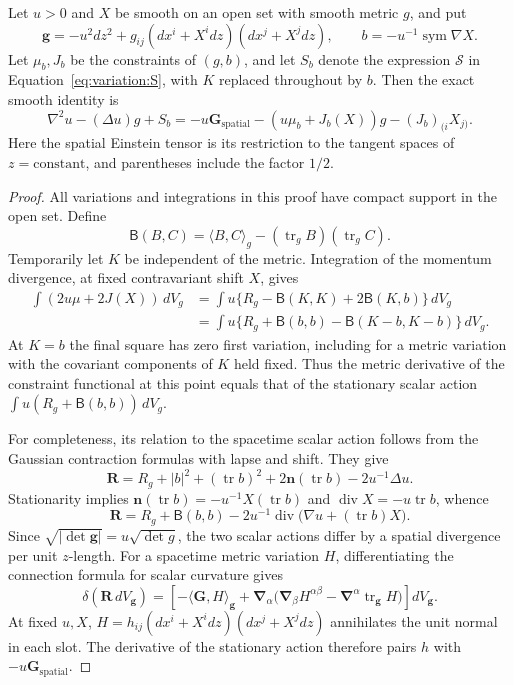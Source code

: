 \begin{lemma}
\label{lem:variation:stationary-action}
Let $u>0$ and $X$ be smooth on an open set with smooth metric $g$, and put
\[
 \mathbf g=-u^2dz^2+g_{ij}(dx^i+X^i dz)(dx^j+X^j dz),
 \qquad b=-u^{-1}\operatorname{sym}\nabla X.
\]
Let $\mu_b,J_b$ be the constraints of $(g,b)$, and let $S_b$ denote
the expression $\mathcal S$ in Equation~\eqref{eq:variation:S}, with
$K$ replaced throughout by $b$.  Then the exact smooth identity is
\[
 \nabla^2u-(\Delta u)g+S_b
  =-u\mathbf G_{\mathrm{spatial}}
        -(u\mu_b+J_b(X))g-(J_b)_{(i}X_{j)}.
\]
Here the spatial Einstein tensor is its restriction to the tangent
spaces of $z=\mathrm{constant}$, and parentheses include the factor
$1/2$.
\end{lemma}

\begin{proof}
All variations and integrations in this proof have compact support in
the open set.  Define
\[
 \mathsf B(B,C)=\langle B,C\rangle_g
                    -(\operatorname{tr}_gB)(\operatorname{tr}_gC).
\]
Temporarily let $K$ be independent of the metric.  Integration of the
momentum divergence, at fixed contravariant shift $X$, gives
\[
 \begin{split}
 \int(2u\mu+2J(X))\,dV_g
 &=\int u\{R_g-\mathsf B(K,K)+2\mathsf B(K,b)\}\,dV_g\\
 &=\int u\{R_g+\mathsf B(b,b)
                  -\mathsf B(K-b,K-b)\}\,dV_g.
 \end{split}
\]
At $K=b$ the final square has zero first variation, including for a
metric variation with the covariant components of $K$ held fixed.
Thus the metric derivative of the constraint functional at this point
equals that of the stationary scalar action
$\int u(R_g+\mathsf B(b,b))\,dV_g$.

For completeness, its relation to the spacetime scalar action follows
from the Gaussian contraction formulas with lapse and shift.  They
give
\[
 \mathbf R=R_g+|b|^2+(\operatorname{tr}b)^2
       +2\mathbf n(\operatorname{tr}b)-2u^{-1}\Delta u.
\]
Stationarity implies
$\mathbf n(\operatorname{tr}b)=-u^{-1}X(\operatorname{tr}b)$ and
$\operatorname{div}X=-u\operatorname{tr}b$, whence
\[
 \mathbf R=R_g+\mathsf B(b,b)
        -2u^{-1}\operatorname{div}
                    \bigl(\nabla u+(\operatorname{tr}b)X\bigr).
\]
Since $\sqrt{|\det\mathbf g|}=u\sqrt{\det g}$, the two scalar actions
differ by a spatial divergence per unit $z$-length.  For a spacetime
metric variation $H$, differentiating the connection formula for
scalar curvature gives
\[
 \delta(\mathbf R\,dV_{\mathbf g})
   =\left[-\langle\mathbf G,H\rangle_{\mathbf g}
    +\boldsymbol\nabla_\alpha
       \bigl(\boldsymbol\nabla_\beta H^{\alpha\beta}
              -\boldsymbol\nabla^\alpha\operatorname{tr}_{\mathbf g}H
       \bigr)\right]dV_{\mathbf g}.
\]
At fixed $u,X$, $H=h_{ij}(dx^i+X^i dz)(dx^j+X^j dz)$ annihilates the
unit normal in each slot.  The derivative of the stationary action
therefore pairs $h$ with $-u\mathbf G_{\mathrm{spatial}}$.


\end{proof}
